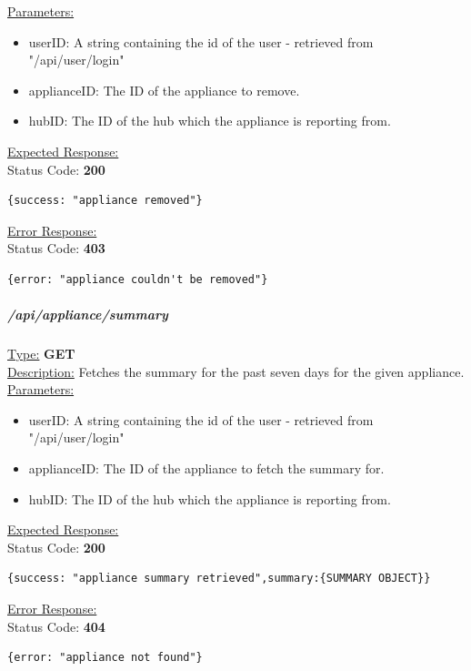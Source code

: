 \documentclass[preprint,12pt,3p]{elsarticle}
\newcommand{\forceindent}{\leavevmode{\parindent=1em\indent}}
\begin{document}
\underline{Parameters:}
\begin{itemize}
\item userID: A string containing the id of the user - retrieved from "/api/user/login"

\item applianceID: The ID of the appliance to remove.

\item hubID: The ID of the hub which the appliance is reporting from.

\end{itemize}
\underline{Expected Response:}\\[5pt]
\forceindent Status Code: \textbf{200} \\
\begin{verbatim}
{success: "appliance removed"}
\end{verbatim}
\underline{Error Response:}\\[5pt]
\forceindent Status Code: \textbf{403} \\
\begin{verbatim}
{error: "appliance couldn't be removed"}
\end{verbatim}

\subparagraph*{/api/appliance/summary}
\underline{Type:} \textbf{GET}\\

\underline{Description:} Fetches the summary for the past seven days for the given appliance.\\

\underline{Parameters:}
\begin{itemize}
\item userID: A string containing the id of the user - retrieved from "/api/user/login"

\item applianceID: The ID of the appliance to fetch the summary for.

\item hubID: The ID of the hub which the appliance is reporting from.

\end{itemize}
\underline{Expected Response:}\\[5pt]
\forceindent Status Code: \textbf{200} \\
\begin{verbatim}
{success: "appliance summary retrieved",summary:{SUMMARY OBJECT}}
\end{verbatim}
\underline{Error Response:}\\[5pt]
\forceindent Status Code: \textbf{404} \\
\begin{verbatim}
{error: "appliance not found"}
\end{verbatim}
\end{document}
